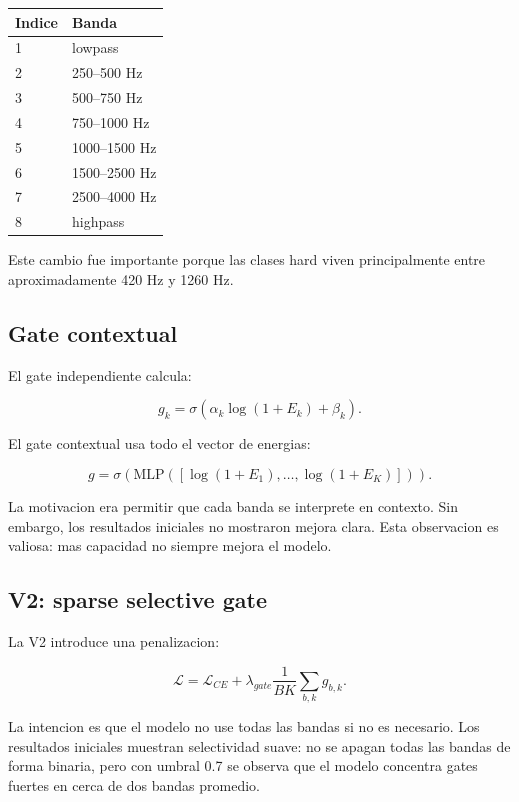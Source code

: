 \documentclass[11pt,letterpaper]{article}
\begin{document}
\begin{center}
\begin{tabular}{ll}
\toprule
Indice & Banda \\
\midrule
1 & lowpass \\
2 & 250--500 Hz \\
3 & 500--750 Hz \\
4 & 750--1000 Hz \\
5 & 1000--1500 Hz \\
6 & 1500--2500 Hz \\
7 & 2500--4000 Hz \\
8 & highpass \\
\bottomrule
\end{tabular}
\end{center}

Este cambio fue importante porque las clases hard viven principalmente entre
aproximadamente 420 Hz y 1260 Hz.

\subsection{Gate contextual}

El gate independiente calcula:

\begin{equation}
    g_k = \sigma(\alpha_k \log(1 + E_k) + \beta_k).
\end{equation}

El gate contextual usa todo el vector de energias:

\begin{equation}
    g = \sigma(\text{MLP}([\log(1+E_1), \ldots, \log(1+E_K)])).
\end{equation}

La motivacion era permitir que cada banda se interprete en contexto. Sin
embargo, los resultados iniciales no mostraron mejora clara. Esta observacion
es valiosa: mas capacidad no siempre mejora el modelo.

\subsection{V2: sparse selective gate}

La V2 introduce una penalizacion:

\begin{equation}
    \mathcal{L} =
    \mathcal{L}_{CE} + \lambda_{gate}\frac{1}{BK}\sum_{b,k} g_{b,k}.
\end{equation}

La intencion es que el modelo no use todas las bandas si no es necesario. Los
resultados iniciales muestran selectividad suave: no se apagan todas las bandas
de forma binaria, pero con umbral 0.7 se observa que el modelo concentra gates
fuertes en cerca de dos bandas promedio.
\end{document}
